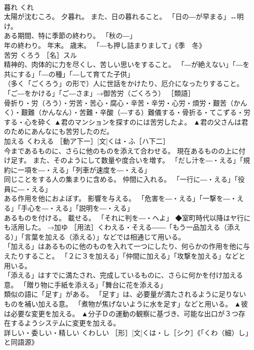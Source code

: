 \documentclass[8pt]{extreport}
\begin{document}
\begin{CJK}{UTF8}{min}
\\	暮れ	くれ	
\\	太陽が沈むころ。 夕暮れ。 また、日の暮れること。 「日の―が早まる」↔明け。 
\\	ある期間、特に季節の終わり。 「秋の―」 
\\	年の終わり。 年末。 歳末。 「―も押し詰まりまして」《季　冬》	
\\	苦労	くろう	［名］スル 
\\	精神的、肉体的に力を尽くし、苦しい思いをすること。 「―が絶えない」「―を共にする」「―の種」「―して育てた子供」 
\\	（多く「ごくろう」の形で）人に世話をかけたり、厄介になったりすること。 「ご―をかける」「ご―さま」→御苦労（ごくろう） ［類語］
\\	骨折り・労（ろう）・労苦・苦心・腐心・辛苦・辛労・心労・煩労・艱苦（かんく）・艱難（かんなん）・苦難・辛酸（―する）難儀する・骨折る・てこずる・労する・心を砕く	▲君のマンションを探すのには苦労したよ。 ▲君の父さんは君のためにあんなにも苦労したのだ。
\\	加える	くわえる	［動ア下一］[文]くは・ふ［ハ下二］ 
\\	今まであるものに、さらに他のものを添えて合わせる。 現在あるものの上に付け足す。 また、そのようにして数量や度合いを増す。 「だし汁を―・える」「規約に一項を―・える」「列車が速度を―・える」 
\\	同じことをする人の集まりに含める。 仲間に入れる。 「一行に―・える」「役員に―・える」 
\\	ある作用を他におよぼす。 影響を与える。 「危害を―・える」「一撃を―・える」「手心を―・える」「説明を―・える」 
\\	あるものを付ける。 載せる。 「それに判を―・へよ」 ◆室町時代以降はヤ行にも活用した。 →加ゆ ［用法］くわえる・そえる――「もう一品加える（添える）」「言葉を加える（添える）」などでは相通じて用いる。 
\\	「加える」はあるものに他のものを入れて一つにしたり、何らかの作用を他に与えたりすること。 「２に３を加える」「仲間に加える」「攻撃を加える」などと用いる。 
\\	「添える」はすでに満たされ、完成しているものに、さらに何かを付け加える意。 「贈り物に手紙を添える」「舞台に花を添える」
\\	類似の語に「足す」がある。 「足す」は、必要量が満たされるように足りないものを補い加える意。 「煮物が焦げないように水を足す」などと用いる。	▲彼は必要な変更を加える。 ▲分子Ｄの運動の観察に基づき、可能な出口が３つ存在するようシステムに変更を加える。
\\	詳しい・委しい・精しい	くわしい	［形］[文]くは・し［シク］《「くわ（細）し」と同語源》 

\end{CJK}
\end{document}
